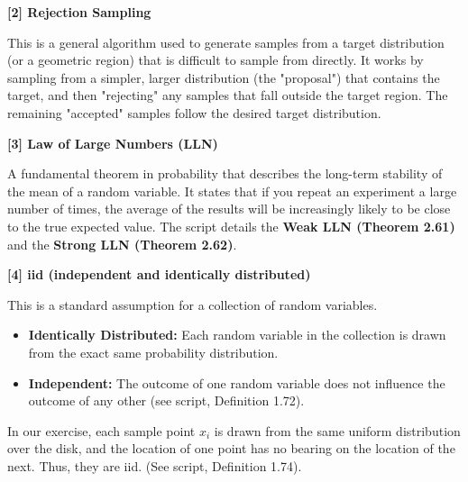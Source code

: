 \documentclass[11pt,a4paper]{article}
\begin{document}
\hypertarget{rejection}{\textbf{[2] Rejection Sampling}}
This is a general algorithm used to generate samples from a target distribution (or a geometric region) that is difficult to sample from directly. It works by sampling from a simpler, larger distribution (the "proposal") that contains the target, and then "rejecting" any samples that fall outside the target region. The remaining "accepted" samples follow the desired target distribution.
\vspace{1em}

\hypertarget{lln}{\textbf{[3] Law of Large Numbers (LLN)}}
A fundamental theorem in probability that describes the long-term stability of the mean of a random variable. It states that if you repeat an experiment a large number of times, the average of the results will be increasingly likely to be close to the true expected value. The script details the \textbf{Weak LLN (Theorem 2.61)} and the \textbf{Strong LLN (Theorem 2.62)}.
\vspace{1em}

\hypertarget{iid}{\textbf{[4] iid (independent and identically distributed)}}
This is a standard assumption for a collection of random variables.
\begin{itemize}
    \item \textbf{Identically Distributed:} Each random variable in the collection is drawn from the exact same probability distribution.
    \item \textbf{Independent:} The outcome of one random variable does not influence the outcome of any other (see script, Definition 1.72).
\end{itemize}
In our exercise, each sample point $x_i$ is drawn from the same uniform distribution over the disk, and the location of one point has no bearing on the location of the next. Thus, they are iid. (See script, Definition 1.74).
\end{document}
